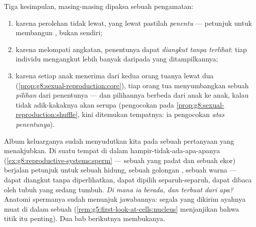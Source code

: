 \begin{proposition}\label{prop:g9:heredity-and-traits:conclusions}
Tiga kesimpulan, masing-masing dipaksa sebuah pengamatan:
\begin{enumerate}
  \item karena  perolehan tidak lewat, yang lewat
        pastilah \emph{penentu} --- petunjuk untuk membangun
        , bukan  sendiri;
  \item karena  melompati angkatan, penentunya dapat
        \emph{diangkut tanpa terlihat}: tiap individu
        mengangkut lebih banyak daripada yang ditampilkannya;
  \item karena setiap anak menerima dari kedua orang tuanya
        lewat dua 
        (\cref{prop:g8:sexual-reproduction:core}), tiap
        orang tua menyumbangkan sebuah \emph{pilihan} dari
        penentunya --- dan pilihannya berbeda dari anak ke
        anak, kalau tidak adik-kakaknya akan serupa
        (pengocokan pada
        \cref{prop:g8:sexual-reproduction:shuffle}, kini
        ditemukan tempatnya: ia pengocokan \emph{atas
        penentunya}).
\end{enumerate}
\end{proposition}
\admitted

\begin{remark}\label{rem:g9:heredity-and-traits:question}
Album keluarganya sudah menyudutkan kita pada sebuah
pertanyaan yang menakjubkan. Di suatu tempat di dalam
hampir-tidak-ada-apa-apanya 
(\cref{ex:g8:reproductive-systems:sperm} --- sebuah 
yang padat dan sebuah ekor) berjalan petunjuk untuk sebuah
hidung, sebuah golongan , sebuah warna  --- dapat
diangkut tanpa diperlihatkan, dapat dipilih separuh-separuh,
dapat dibaca oleh tubuh yang sedang tumbuh. \emph{Di mana ia
berada, dan terbuat dari apa?} Anatomi spermanya sudah
menunjuk jawabannya: segala yang dikirim ayahnya muat di
dalam sebuah 
(\cref{rem:g5:first-look-at-cells:nucleus} menjanjikan bahwa
titik itu penting). Dua bab berikutnya membukanya.
\end{remark}

